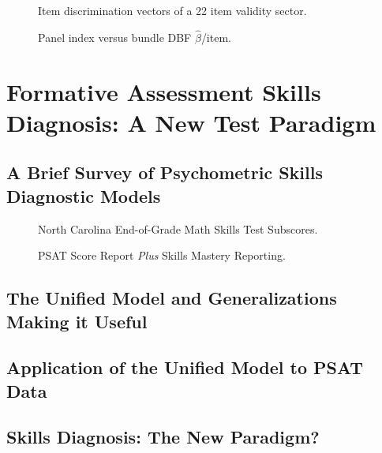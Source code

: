 \documentclass[titlepage,11pt,twoside]{article}
\begin{document}
\begin{figure}[h]
\caption{Item discrimination vectors of a 22 item validity sector.}
\end{figure}



\begin{figure}[h]
\caption{Panel index versus bundle DBF $\hat {\beta}$/item.}
\end{figure}



\section{Formative Assessment Skills Diagnosis: A New Test Paradigm}



\subsection{A Brief Survey of Psychometric Skills Diagnostic Models}



\begin{figure}[h]
\caption{North Carolina End-of-Grade Math Skills Test Subscores.}
\end{figure}



\begin{figure}[h]
\caption{PSAT Score Report \textit{Plus} Skills Mastery Reporting.}
\end{figure}




\subsection{The Unified Model and Generalizations Making it Useful}



\subsection{Application of the Unified Model to PSAT Data}


\subsection{Skills Diagnosis: The New Paradigm?}
\end{document}
